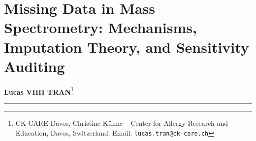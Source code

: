 \documentclass[11pt,oneside]{book}
\begin{document}
\setcounter{chapter}{18}
\chapter{Missing Data in Mass Spectrometry: Mechanisms, Imputation Theory, and Sensitivity Auditing}

\noindent
\textbf{Lucas VHH TRAN}\footnote{CK-CARE Davos, Christine K\"uhne -- Center for Allergy Research and Education, Davos, Switzerland. Email: \texttt{lucas.tran@ck-care.ch}}\\
\rule{\textwidth}{0.8pt}

\begin{abstract}
\noindent
Quantitative mass spectrometry datasets contain between 20\% and 50\% missing values~\cite{webb2020review, lazar2016accounting}. In clinical biomarker cohorts, this missingness presents an acute methodological problem: standard multivariate algorithms require complete matrices, yet the numerical substitution of missing values alters the variance structure, covariance relationships, and downstream statistical inferences of the entire dataset. Missingness in mass spectrometry does not arise from a single homogeneous process. A feature may be absent due to stochastic precursor selection during instrument duty cycles (Missing at Random; MAR), physical left-censoring below the instrument limit of detection (Missing Not at Random; MNAR), or true biological non-expression. Applying a MAR algorithm such as $k$-nearest neighbors to an MNAR peptide invents artificial intermediate abundances for molecules that were genuinely absent, while applying left-censored substitution to MAR values introduces downward bias and artificially inflates differential abundance discoveries. This chapter establishes the statistical, biophysical, and computational foundations required to diagnose, model, and impute missing data in mass spectrometry. We formalize Rubin's missing data taxonomy within an analytical chemistry context, analyze the mathematical properties of deterministic, stochastic, and machine-learning imputation algorithms, derive Rubin's pooling rules for multiple imputation with Barnard--Rubin small-sample degrees of freedom, and evaluate imputation-free probabilistic dropout modeling (\texttt{proDA}). The chapter concludes with a tutor diagnostic heuristics checklist, an end-to-end reproducible R laboratory, the Five Deadly Sins of omics imputation, and multi-tier exercises with worked solutions.
\end{abstract}
\end{document}

